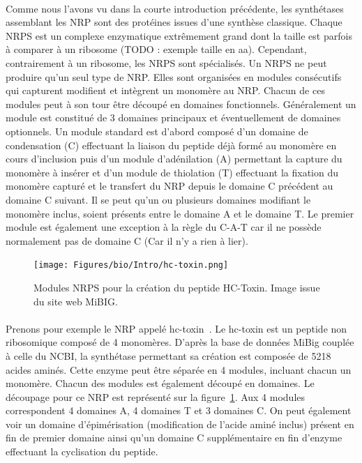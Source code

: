 \documentclass[12pt,french,twoside]{report}
\begin{document}
\paragraph{}Comme nous l'avons vu dans la courte introduction précédente, les synthétases assemblant les NRP sont des protéines issues d'une synthèse classique.
Chaque NRPS est un complexe enzymatique extrêmement grand dont la taille est parfois à comparer à un ribosome (TODO : exemple taille en aa).
Cependant, contrairement à un ribosome, les NRPS sont spécialisés.
Un NRPS ne peut produire qu'un seul type de NRP.
Elles sont organisées en modules consécutifs qui capturent modifient et intègrent un monomère au NRP\cite{schwarzer_nonribosomal_2003,marahiel_modular_1997}.
Chacun de ces modules peut à son tour être découpé en domaines fonctionnels.
Généralement un module est constitué de 3 domaines principaux et éventuellement de domaines optionnels\cite{finking_biosynthesis_2004}.
Un module standard est d'abord composé d'un domaine de condensation (C) effectuant la liaison du peptide déjà formé au monomère en cours d'inclusion puis d'un module d'adénilation (A) permettant la capture du monomère à insérer et d'un module de thiolation (T) effectuant la fixation du monomère capturé et le transfert du NRP depuis le domaine C précédent au domaine C suivant.
Il se peut qu'un ou plusieurs domaines modifiant le monomère inclus, soient présents entre le domaine A et le domaine T.
Le premier module est également une exception à la règle du C-A-T car il ne possède normalement pas de domaine C (Car il n'y a rien à lier).

\begin{figure}[h!]
  \begin{center}
    \texttt{[image: Figures/bio/Intro/hc-toxin.png]}
    \caption{\label{mibig_hc}Modules NRPS pour la création du peptide HC-Toxin.
    Image issue du site web MiBIG.}
  \end{center}
\end{figure}

\paragraph{}Prenons pour exemple le NRP appelé hc-toxin~\cite{_mibig:_????}.
Le hc-toxin est un peptide non ribosomique composé de 4 monomères.
D'après la base de données MiBig couplée à celle du NCBI, la synthétase permettant sa création est composée de 5218 acides aminés.
Cette enzyme peut être séparée en 4 modules, incluant chacun un monomère.
Chacun des modules est également découpé en domaines.
Le découpage pour ce NRP est représenté sur la figure~\ref{mibig_hc}.
Aux 4 modules correspondent 4 domaines A, 4 domaines T et 3 domaines C.
On peut également voir un domaine d'épimérisation (modification de l'acide aminé inclus) présent en fin de premier domaine ainsi qu'un domaine C supplémentaire en fin d'enzyme effectuant la cyclisation du peptide.
\end{document}
